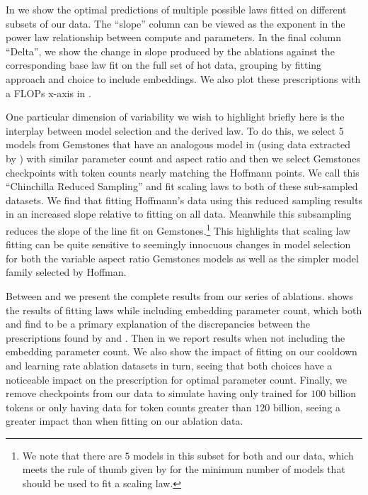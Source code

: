 \documentclass{article}
\begin{document}
In  we show the optimal predictions of multiple possible laws fitted on different subsets of our data. 
The ``slope'' column can be viewed as the exponent in the power law relationship between compute and parameters.
In the final column ``Delta'', we show the change in slope produced by the ablations against the corresponding base law fit on the full set of hot data, grouping by fitting approach and choice to include embeddings.
We also plot these prescriptions with a FLOPs x-axis in . 

One particular dimension of variability we wish to highlight briefly here is the interplay between model selection and the derived law.
To do this, we select 5 models from Gemstones that have an analogous model in \citet{hoffmann2022empirical} (using data extracted by \citet{besiroglu2024chinchilla}) with similar parameter count and aspect ratio and then we select Gemstones checkpoints with token counts nearly matching the Hoffmann points.
We call this ``Chinchilla Reduced Sampling'' and fit scaling laws to both of these sub-sampled datasets.
We find that fitting Hoffmann's data using this reduced sampling results in an increased slope relative to fitting on all data. Meanwhile this subsampling reduces the slope of the line fit on Gemstones.\footnote{We note that there are \(5\) models in this subset for both \citet{hoffmann2022empirical} and our data, which meets the rule of thumb given by \citet{choshen2024hitchhiker} for the minimum number of models that should be used to fit a scaling law.} %
This highlights that scaling law fitting can be quite sensitive to seemingly innocuous changes in model selection for both the variable aspect ratio Gemstones models as well as the simpler model family selected by Hoffman.

Between  and  we present the complete results from our series of ablations.  shows the results of fitting laws while including embedding parameter count, which both \citet{pearce2024reconciling} and \citet{porian2024resolving} find to be a primary explanation of the discrepancies between the prescriptions found by \citet{kaplan2020scaling} and \citet{hoffmann2022empirical}. 
Then in  we report results when not including the embedding parameter count.
We also show the impact of fitting on our cooldown and learning rate ablation datasets in turn, seeing that both choices have a noticeable impact on the prescription for optimal parameter count.
Finally, we remove checkpoints from our data to simulate having only trained for \(100\) billion tokens or only having data for token counts greater than \(120\) billion, seeing a greater impact than when fitting on our ablation data.
\end{document}
